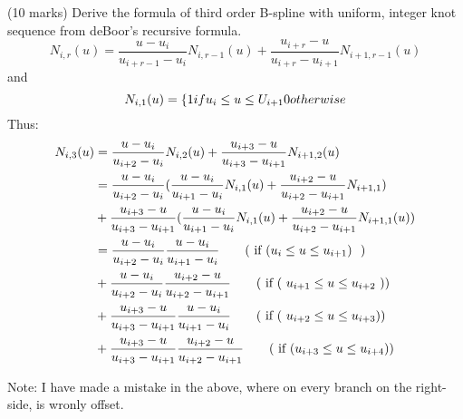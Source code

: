 (10 marks) Derive the formula of third order B-spline with uniform, integer knot sequence from deBoor’s recursive formula.
$$N_{i,r}(u) = \frac {u - u_{i}} {u_{i+r-1} - u_{i}} N_{i,r-1}(u)     +      \frac{u_{i+r} - u } { u_{i+r} - u_{i+1}} N_{i+1,r-1} (u)$$
and 
$$N_{i,1}(u) = \{ 1 if u_{i} \leq  u  \leq U_{i+1} \\ 0 otherwise$$
Thus:
\begin{align*}
N_{i,3}(u)  &= \frac {u - u_{i}} {u_{i+2} - u_{i}} N_{i,2}(u)     +      \frac{u_{i+3} - u} { u_{i+3} - u_{i+1}} N_{i+1,2} (u)  \\
            &= \frac {u - u_{i}} {u_{i+2} - u_{i}} ( \frac{u - u_{i}} {u_{i+1} - u_{i}} N_{i,1}(u) +  \frac{u_{i+2} - u } { u_{i+2} - u_{i+1}} N_{i+1,1} )\\
            &+ \frac {u_{i+3} - u} { u_{i+3} - u_{i+1}} ( \frac {u - u_{i}} {u_{i+1} - u_{i}} N_{i,1}(u) +  \frac{u_{i+2} - u } { u_{i+2} - u_{i+1} } N_{i+1,1}(u) ) \\
            &= \frac {u - u_{i}} {u_{i+2} - u_{i}} \frac{u - u_{i}} {u_{i+1} - u_{i}}  \tag{\text{ if ($ u_i \leq u \leq u_{i+1} $) } } \\
            &+ \frac {u - u_{i}} {u_{i+2} - u_{i}}  \frac{u_{i+2} - u } { u_{i+2} - u_{i+1}}  \tag{\text{ if ( $u_{i+1} \leq u \leq u_{i+2}$ )}} \\
            &+ \frac {u_{i+3} - u} { u_{i+3} - u_{i+1}} \frac {u - u_{i}} {u_{i+1} - u_{i}} \tag{\text{ if ( $u_{i+2} \leq u \leq u_{i+3} $)}} \\
            &+ \frac {u_{i+3} - u} { u_{i+3} - u_{i+1}} \frac{u_{i+2} - u } { u_{i+2} - u_{i+1} } \tag{\text{ if ($ u_{i+3} \leq u \leq u_{i+4} $)}}
\end{align*}


Note: I have made a mistake in the above, where on every branch on the right-side, is wronly offset.

